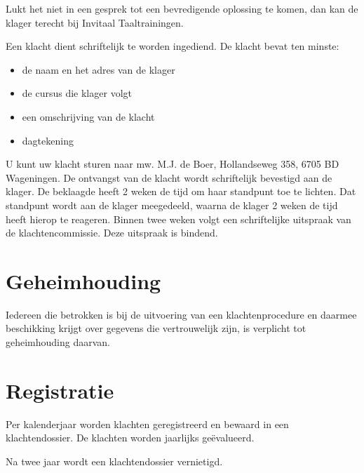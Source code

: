 \documentclass[a4paper]{article}
\begin{document}
Lukt het niet in een gesprek tot een bevredigende oplossing te komen, dan kan de klager terecht bij Invitaal Taaltrainingen.

Een klacht dient schriftelijk te worden ingediend. De klacht bevat ten minste:

\begin{itemize}
	\item de naam en het adres van de klager
	\item de cursus die klager volgt
	\item een omschrijving van de klacht
	\item dagtekening
\end{itemize}

U kunt uw klacht sturen naar mw. M.J. de Boer,  Hollandseweg 358, 6705 BD Wageningen. De ontvangst van de klacht wordt schriftelijk bevestigd aan de klager. De beklaagde heeft 2 weken de tijd om haar standpunt toe te lichten. Dat standpunt wordt aan de klager meegedeeld, waarna de klager 2 weken de tijd heeft hierop te reageren. Binnen twee weken volgt een schriftelijke uitspraak van de klachtencommissie. Deze uitspraak is bindend.

\section*{Geheimhouding}

Iedereen die betrokken is bij de uitvoering van een klachtenprocedure en daarmee beschikking krijgt over gegevens die vertrouwelijk zijn, is verplicht tot geheimhouding daarvan.

\section*{Registratie}

Per kalenderjaar worden klachten geregistreerd en bewaard in een klachtendossier. De klachten worden jaarlijks ge\"evalueerd.

Na twee jaar wordt een klachtendossier vernietigd.
\end{document}
